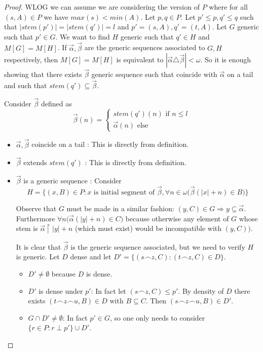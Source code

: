 \documentclass[a4paper,12pt]{article}
\theoremstyle{plain}
\theoremstyle{definition}
\theoremstyle{remark}
\begin{document}
\begin{proof}
	
	WLOG we can assume we are considering the version of $P$ where for all $(s,A) \in P$ we have $max(s) < min(A)$.
	Let $p,q \in P$. Let $p' \leq p, q' \leq q$ such that $|stem(p')| = |stem(q')| = l$ and  $p' = (s,A), q' = (t,A)$.
	Let $G$ generic such that $p' \in G$. We want to find $H$ generic such that $q' \in H$ and $M[G] = M[H]$.
	If $\vec{\alpha}, \vec{\beta}$ are the generic sequences associated to $G, H$ respectively, then $M[G] = M[H]$ is 
	equivalent to $|\vec{\alpha} \triangle \vec{\beta}| < \omega$.
	So it is enough showing that there exists $\vec{\beta}$ generic sequence such that coincide with $\vec{\alpha}$ on a tail
	and such that $stem(q') \subseteq \vec{\beta}$.

	Consider $\vec{\beta}$ defined as
	\[
		\vec{\beta}(n) =
		\begin{cases}
			stem(q')(n) \text{ if } n \leq l \\
			\vec{\alpha}(n) \text{ else } 
		\end{cases}
	\]

	\begin{itemize}
		\item $\vec{\alpha}, \vec{\beta}$ coincide on a tail :
			This is directly from definition.
		\item $\vec{\beta}$ extends $stem(q')$ :
			This is directly from definition.
		\item $\vec{\beta}$ is a generic sequence :
			Consider 
			\[
				H = \{(x,B) \in P : x \text{ is initial segment of } \vec{\beta}, 
				\forall n \in \omega \big(\vec{\beta}(|x| +n) \in B \big) \}
			\]

			Observe that $G$ must be made in a similar fashion: $(y,C) \in G \Rightarrow y \subseteq \vec{\alpha}$. Furthermore 
			$\forall n \big(\vec{\alpha}(|y|+n) \in C \big)$ because otherwise any element of $G$ whose stem is 
			$\vec{\alpha} \restriction{|y|+n}$ (which must exist) would be incompatible with $(y,C))$.

			It is clear that $\vec{\beta}$ is the generic sequence associated, but we need to verify $H$ is generic.
			Let $D$ dense and let $D' = \{(s \frown z,C) : (t \frown z, C) \in D\}$.
			\begin{itemize}
				\item $D' \not = \emptyset$ because $D$ is dense.
				\item $D'$ is dense under $p'$:
					In fact let $(s \frown z,C) \leq p'$. 
					By density of $D$ there exists $(t \frown z \frown u, B) \in D$ with $B \subseteq C$.
					Then $(s \frown z \frown u,B) \in D'$.
				\item $G \cap D' \not = \emptyset$:
					In fact $p' \in G$, so one only needs to consider $\{r \in P : r \perp p'\} \cup D'$.
			\end{itemize}


\end{itemize}
\end{proof}
\end{document}
